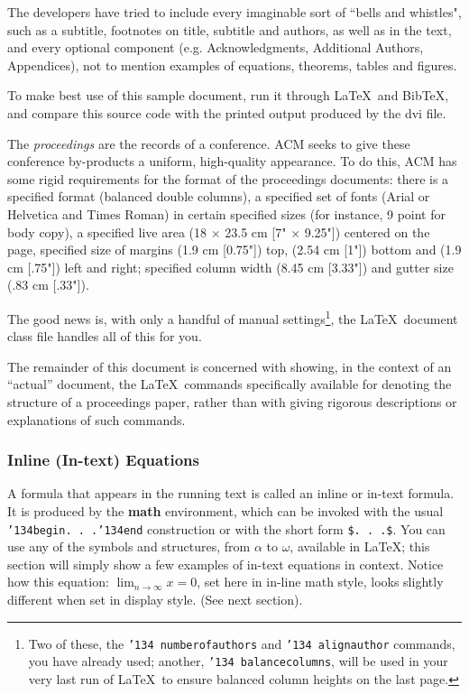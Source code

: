 \documentclass{acm_proc_article-sp}
\begin{document}
The developers have tried to include every imaginable sort
of ``bells and whistles", such as a subtitle, footnotes on
title, subtitle and authors, as well as in the text, and
every optional component (e.g. Acknowledgments, Additional
Authors, Appendices), not to mention examples of
equations, theorems, tables and figures.

To make best use of this sample document, run it through \LaTeX\
and BibTeX, and compare this source code with the printed
output produced by the dvi file.


The \textit{proceedings} are the records of a conference.
ACM seeks to give these conference by-products a uniform,
high-quality appearance.  To do this, ACM has some rigid
requirements for the format of the proceedings documents: there
is a specified format (balanced  double columns), a specified
set of fonts (Arial or Helvetica and Times Roman) in
certain specified sizes (for instance, 9 point for body copy),
a specified live area (18 $\times$ 23.5 cm [7" $\times$ 9.25"]) centered on
the page, specified size of margins (1.9 cm [0.75"]) top, (2.54 cm [1"]) bottom
and (1.9 cm [.75"]) left and right; specified column width
(8.45 cm [3.33"]) and gutter size (.83 cm [.33"]).

The good news is, with only a handful of manual
settings\footnote{Two of these, the {\texttt{\char'134 numberofauthors}}
and {\texttt{\char'134 alignauthor}} commands, you have
already used; another, {\texttt{\char'134 balancecolumns}}, will
be used in your very last run of \LaTeX\ to ensure
balanced column heights on the last page.}, the \LaTeX\ document
class file handles all of this for you.

The remainder of this document is concerned with showing, in
the context of an ``actual'' document, the \LaTeX\ commands
specifically available for denoting the structure of a
proceedings paper, rather than with giving rigorous descriptions
or explanations of such commands.

\subsubsection{Inline (In-text) Equations}
A formula that appears in the running text is called an
inline or in-text formula.  It is produced by the
\textbf{math} environment, which can be
invoked with the usual \texttt{{\char'134}begin. . .{\char'134}end}
construction or with the short form \texttt{\$. . .\$}. You
can use any of the symbols and structures,
from $\alpha$ to $\omega$, available in
\LaTeX\cite{Lamport:LaTeX}; this section will simply show a
few examples of in-text equations in context. Notice how
this equation: \begin{math}\lim_{n\rightarrow \infty}x=0\end{math},
set here in in-line math style, looks slightly different when
set in display style.  (See next section).
\end{document}
